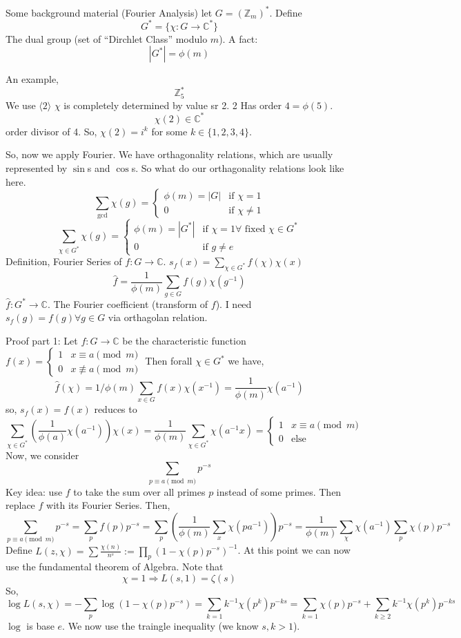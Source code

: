 \documentclass{article}
\begin{document}
Some background material (Fourier Analysis) let $G = {(\mathbb{Z}_{m})}^*$. Define
\[G^* = \{ \chi : G \rightarrow \mathbb{C}^* \} \]
The dual group (set of ``Dirchlet Class'' modulo $m$). A fact:
\[ |G^*| = \phi(m) \]

An example, 
\[ \mathbb{Z}_5^* \]
We use $\langle 2 \rangle$ $\chi$ is completely determined by value sr 2. 2 Has
order $4 = \phi(5)$. 
\[ \chi(2) \in\mathbb{C}^* \]
order divisor of 4. So, $\chi(2) = i^k$ for some $k \in \{1,2,3,4\}$. 

So, now we apply Fourier. We have orthagonality relations, which are usually
represented by $\sin$s and $\cos$s. So what do our orthagonality relations look
like here. 
\[ \sum_{\gcd}\chi(g) = \begin{cases} \phi(m) = |G| &\text{if } \chi = 1 \\
0 &\text{if } \chi \neq 1 \end{cases} \]
\[ \sum_{\chi \in G^*} \chi(g) = \begin{cases} \phi(m) = |G^*| &\text{if } \chi
= 1 \forall\text{ fixed } \chi \in G^* \\ 
0 &\text{if } g \neq e \end{cases}\]
Definition, Fourier Series of $f:G\rightarrow \mathbb{C}$. $s_f(x) =
\sum_{\chi \in G^*}\hat{f}(\chi)\chi(x) $
\[ \hat{f} = \frac{1}{\phi(m)} \sum_{g \in G} f(g) \chi(g^{-1}) \]
$\hat{f} : G^* \rightarrow \mathbb{C}$. The Fourier coefficient (transform of
$f$). I need $s_f(g) = f(g) \forall g \in G $ via orthagolan relation. 

Proof part 1: Let $f: G \rightarrow \mathbb{C}$ be the characteristic function
$f(x) = \begin{cases} 1 & x \equiv a \pmod{m} \\ 0  & x \not\equiv a \pmod{m}
\end{cases}$
Then forall $\chi \in G^*$ we have,
\[ \hat{f}(\chi) = 1/\phi(m) \sum_{x \in G} f(x) \chi(x^{-1}) =
\frac{1}{\phi(m)} \chi(a^{-1}) \]
so, $s_f (x) =  f(x)$ reduces to
\[ \sum_{\chi \in G^*} ( \frac{1}{\phi(a)}\chi(a^{-1}) ) \chi(x) =
\frac{1}{\phi(m)} \sum_{\chi \in G^*}\chi(a^{-1}x) = \begin{cases} 1 & x \equiv
a \pmod{m} \\
0 & \text{else} \end{cases} \]
Now, we consider 
\[ \sum_{p \equiv a \pmod{m}} p^{-s} \]
Key idea: use $f$ to take the sum over all primes $p$ instead of some primes.
Then replace $f$ with its Fourier Series. Then, 
\[ \sum_{p \equiv a \pmod{m}} p^{-s} = \sum_{p} f(p) p^{-s} = \sum_p
\left(\frac{1}{\phi(m)}\sum_x \chi(pa^{-1})\right) p^{-s} =
\frac{1}{\phi(m)}\sum_{\chi} \chi(a^{-1})\sum_p \chi(p)p^{-s} \]
Define $L(z,\chi) = \sum \frac{\chi(n)}{n^s} := \prod_p (1 - \chi(p)p^{-s})^{-1}$. 
At this point we can now use the fundamental theorem of Algebra. Note that
\[ \chi = 1 \Rightarrow L(s,1) = \zeta(s) \]
So, 
\[ \log L(s,\chi) = -\sum_p \log(1-\chi(p)p^{-s}) = \sum_{k = 1} k^{-1}
\chi(p^k) p^{-ks} = \sum_{k = 1} \chi(p)p^{-s} + \sum_{k \geq
2}k^{-1}\chi(p^k)p^{-ks} \]
$\log$ is base $e$. 
We now use the traingle inequality (we know $s,k > 1$). 
\end{document}

